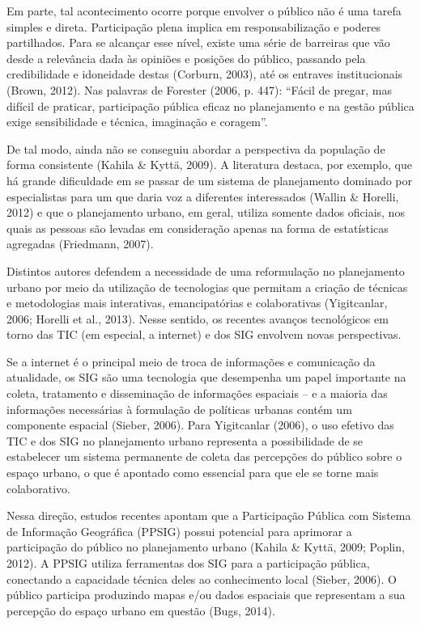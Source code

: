 \documentclass{article}
\begin{document}
Em parte, tal acontecimento ocorre porque envolver o público não é uma tarefa
simples
e direta. Participação plena implica em responsabilização e poderes partilhados.
Para se alcançar esse nível, existe uma série de barreiras que vão desde a
relevância dada às opiniões e posições do público, passando pela credibilidade e
idoneidade destas (Corburn, 2003), até os
entraves institucionais (Brown, 2012). Nas
palavras de Forester (2006, p. 447): “Fácil
de pregar, mas difícil de praticar, participação pública eficaz no planejamento
e na
gestão pública exige sensibilidade e técnica, imaginação e coragem”.

De tal modo, ainda não se conseguiu abordar a perspectiva da população de forma
consistente (Kahila \& Kyttä, 2009). A
literatura destaca, por exemplo, que há grande dificuldade em se passar de um
sistema de planejamento dominado por especialistas para um que daria voz a
diferentes interessados (Wallin \& Horelli,
2012) e que o planejamento urbano, em geral, utiliza somente dados
oficiais, nos quais as pessoas são levadas em consideração apenas na forma de
estatísticas agregadas (Friedmann,
2007).

Distintos autores defendem a necessidade de uma reformulação no planejamento
urbano
por meio da utilização de tecnologias que permitam a criação de técnicas e
metodologias mais interativas, emancipatórias e colaborativas (Yigitcanlar,
2006; Horelli et
al., 2013). Nesse sentido, os recentes avanços tecnológicos em torno das
TIC (em especial, a internet) e dos SIG envolvem novas perspectivas.

Se a internet é o principal meio de troca de informações e comunicação da
atualidade,
os SIG são uma tecnologia que desempenha um papel importante na coleta,
tratamento e
disseminação de informações espaciais – e a maioria das informações necessárias
à
formulação de políticas urbanas contém um componente espacial (Sieber, 2006).
Para Yigitcanlar (2006), o uso efetivo das TIC e dos SIG no planejamento
urbano representa a possibilidade de se estabelecer um sistema permanente de
coleta
das percepções do público sobre o espaço urbano, o que é apontado como essencial
para que ele se torne mais colaborativo.

Nessa direção, estudos recentes apontam que a Participação Pública com Sistema
de
Informação Geográfica (PPSIG) possui potencial para aprimorar a participação do
público no planejamento urbano (Kahila \& Kyttä,
2009; Poplin, 2012). A PPSIG
utiliza ferramentas dos SIG para a participação pública, conectando a capacidade
técnica deles ao conhecimento local (Sieber,
2006). O público participa produzindo mapas e/ou dados espaciais que
representam a sua percepção do espaço urbano em questão (Bugs, 2014).
\end{document}
